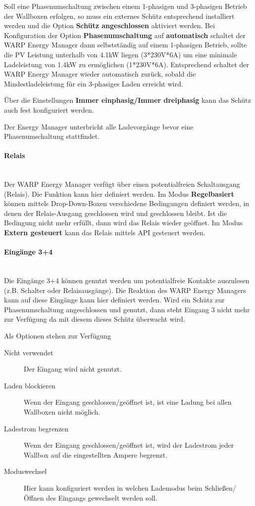 \documentclass[a4paper,10pt]{article}
\begin{document}
\begin{multicols*}{2}
	Soll eine Phasenumschaltung zwischen einem 1-phasigen und 3-phasigen Betrieb
	der Wallboxen erfolgen, so muss ein externes Schütz entsprechend installiert
	werden und die Option \textbf{Schütz angeschlossen} aktiviert werden. Bei
	Konfiguration der Option \textbf{Phasenumschaltung} auf \textbf{automatisch}
	schaltet der WARP Energy Manager dann selbstständig auf einem 1-phasigen
	Betrieb, sollte die PV Leistung unterhalb von 4.1kW liegen (3*230V*6A) um
	eine minimale Ladeleistung von 1.4kW zu ermöglichen (1*230V*6A).
	Entsprechend schaltet der WARP Energy Manager wieder automatisch zurück,
	sobald die Mindestladeleistung für ein 3-phasiges Laden erreicht wird.

	Über die Einstellungen \textbf{Immer einphasig/Immer dreiphasig} kann das
	Schütz auch fest konfiguriert werden.

	Der Energy Manager unterbricht alle Ladevorgänge bevor eine
	Phasenumschaltung stattfindet.

	\paragraph{Relais}\ \\
	Der WARP Energy Manager verfügt über einen potentialfreien Schaltausgang
	(Relais). Die Funktion kann hier definiert werden. Im Modus
	\textbf{Regelbasiert} können mittels Drop-Down-Boxen verschiedene Bedingungen definiert werden, in
	denen der Relais-Ausgang geschlossen wird und geschlossen bleibt. Ist die
	Bedingung nicht mehr erfüllt, dann wird das Relais wieder geöffnet.
	Im Modus \textbf{Extern gesteuert} kann das Relais mittels API gesteuert
	werden.
	\paragraph{Eingänge 3+4}\ \\
	Die Eingänge 3+4 können genutzt werden um potentialfreie Kontakte auszulesen
	(z.B. Schalter oder Relaisausgänge). Die Reaktion des WARP Energy Managers
	kann auf diese Eingänge kann hier definiert werden. Wird ein Schütz zur
	Phasenumschaltung angeschlossen und genutzt, dann steht Eingang 3 nicht mehr
	zur Verfügung da mit diesem dieses Schütz überwacht wird.

	Als Optionen stehen zur Verfügung
	\begin{description}
		\item[Nicht verwendet] Der Eingang wird nicht genutzt.
		\item[Laden blockieren] Wenn der Eingang geschlossen/geöffnet ist, ist
		eine Ladung bei allen Wallboxen nicht möglich.
		\item[Ladestrom begrenzen] Wenn der Eingang geschlossen/geöffnet ist,
		wird der Ladestrom jeder Wallbox auf die eingestellten Ampere begrenzt.
		\item[Moduswechsel] Hier kann konfiguriert werden in welchen Lademodus
		beim Schließen/Öffnen des Eingangs gewechselt werden soll.
	\end{description}


\end{multicols*}
\end{document}
